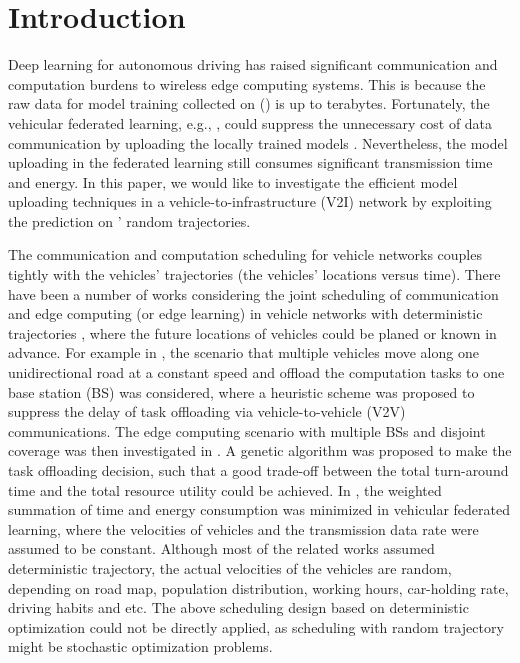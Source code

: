 \section{Introduction}
\label{sec:introduction}
Deep learning for autonomous driving \cite{ad-survey} has raised significant communication and computation burdens to wireless edge computing systems. This is because the raw data for model training collected on {\IAVFullnames} ({\IAVs}) is up to terabytes. Fortunately, the vehicular federated learning, e.g., \cite{icra21-invs,feel-wangs}, could suppress the unnecessary cost of data communication by uploading the locally trained models \cite{vfl-survey}. Nevertheless, the model uploading in the federated learning still consumes significant transmission time and energy. In this paper, we would like to investigate the efficient model uploading techniques in a  vehicle-to-infrastructure (V2I) network by exploiting the prediction on {\IAVs}' random trajectories.

The communication and computation scheduling for vehicle networks couples tightly with the vehicles' trajectories (the vehicles' locations versus time).
There have been a number of works considering the joint scheduling of communication and edge computing (or edge learning) in vehicle networks with deterministic trajectories
\cite{Globecom18-Wang, Access19-Xu, TITS21-Xiao, JSAC23-Pervej, IOTJ22-Lv, TVT22-Hui, ICC23-Bansal},
where the future locations of vehicles could be planed or known in advance.
For example in \cite{Globecom18-Wang}, the scenario that multiple vehicles move along one unidirectional road at a constant speed and offload the computation tasks to one base station (BS) was considered, where a heuristic scheme was proposed to suppress the delay of task offloading via vehicle-to-vehicle (V2V) communications.
The edge computing scenario with multiple BSs and disjoint coverage was then investigated in \cite{Access19-Xu}. A genetic algorithm was proposed to make the task offloading decision, such that a good trade-off between the total turn-around time and the total resource utility could be achieved.
In \cite{TITS21-Xiao}, the weighted summation of time and energy consumption was minimized in vehicular federated learning, where the velocities of vehicles and the transmission data rate were assumed to be constant. 
Although most of the related works assumed deterministic trajectory, the actual velocities of the vehicles are random, depending on road map, population distribution, working hours, car-holding rate, driving habits and etc. The above scheduling design based on deterministic optimization could not be directly applied, as scheduling with random trajectory might be stochastic optimization problems.

